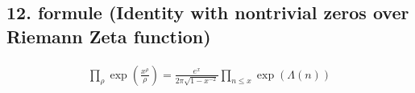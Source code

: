 \subsection{12. formule (Identity with nontrivial zeros over Riemann Zeta function)}

\begin{align}
        \prod_{\rho}\exp\left(\frac{x^{\rho}}{\rho}\right) = 
        \frac{e^x}{2\pi\sqrt{1-x^{-2}}}\prod_{n\leq x}\exp(\Lambda(n))
\end{align}
